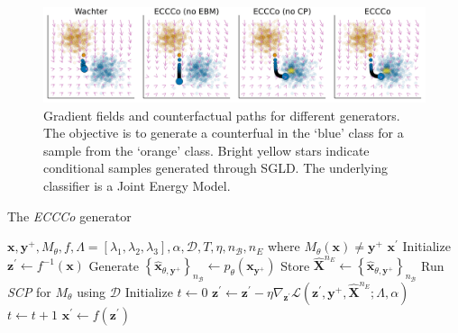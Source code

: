 \documentclass{article}
\begin{document}
\begin{figure}
  \centering
  \includegraphics[width=1.0\textwidth]{../artifacts/results/images/poc_gradient_fields.png}
  \caption{Gradient fields and counterfactual paths for different generators. The objective is to generate a counterfual in the `blue' class for a sample from the `orange' class. Bright yellow stars indicate conditional samples generated through SGLD. The underlying classifier is a Joint Energy Model.}\label{fig:poc}
\end{figure}

\renewcommand{\algorithmicrequire}{\textbf{Input:}}
\renewcommand{\algorithmicensure}{\textbf{Output:}}

\begin{algorithm}
  \caption{The \textit{ECCCo} generator}\label{alg:eccco}
  \begin{algorithmic}[1]
    \Require $\mathbf{x}, \mathbf{y}^+, M_{\theta}, f, \Lambda=[\lambda_1,\lambda_2,\lambda_3], \alpha, \mathcal{D}, T, \eta, n_{\mathcal{B}}, n_E$ where $M_{\theta}(\mathbf{x})\neq\mathbf{y}^+$
    \Ensure $\mathbf{x}^\prime$
    \State Initialize $\mathbf{z}^\prime \gets f^{-1}(\mathbf{x})$ 
    \State Generate $\left\{\hat{\mathbf{x}}_{\theta,\mathbf{y}^+}\right\}_{n_{\mathcal{B}}} \gets p_{\theta}(\mathbf{x}_{\mathbf{y}^+})$ 
    \State Store $\hat{\mathbf{X}}^{n_E} \gets \left\{\hat{\mathbf{x}}_{\theta,\mathbf{y}^+}\right\}_{n_{\mathcal{B}}}$ 
    \State Run \textit{SCP} for $M_{\theta}$ using $\mathcal{D}$ 
    \State Initialize $t \gets 0$
     
    \State $\mathbf{z}^\prime \gets \mathbf{z}^\prime - \eta \nabla_{\mathbf{z}^\prime} \mathcal{L}(\mathbf{z}^\prime,\mathbf{y}^+,\hat{\mathbf{X}}^{n_E}; \Lambda, \alpha)$ 
    \State $t \gets t+1$
    \EndWhile
    \State $\mathbf{x}^\prime \gets f(\mathbf{z}^\prime)$ 
  \end{algorithmic}
\end{algorithm}
\end{document}

